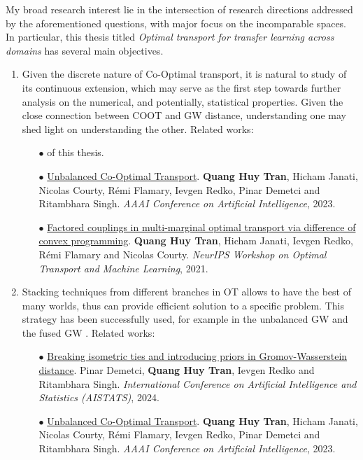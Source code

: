 My broad research interest lie in the intersection of research directions addressed
by the aforementioned questions, with major focus on the incomparable spaces.
In particular, this thesis titled
\textit{Optimal transport for transfer learning across domains} has several main objectives.
\begin{enumerate}
    \item Given the discrete nature of Co-Optimal transport, it is natural to study of its continuous extension,
    which may serve as the first step towards further analysis on the numerical,
    and potentially, statistical properties. Given the close connection between
    COOT and GW distance,
    understanding one may shed light on understanding the other. Related works:
    \begin{itemize}
        \item[$\bullet$]  of this thesis.

        \item[$\bullet$] \ul{Unbalanced Co-Optimal Transport}. \textbf{Quang Huy Tran},
        Hicham Janati, Nicolas Courty, Rémi Flamary, Ievgen Redko, Pinar Demetci and Ritambhara Singh.
        \textit{AAAI Conference on Artificial Intelligence}, 2023.

        \item[$\bullet$] \ul{Factored couplings in multi-marginal optimal transport via difference of
        convex programming}. \textbf{Quang Huy Tran}, Hicham Janati, Ievgen Redko,
        Rémi Flamary and Nicolas Courty.
        \textit{NeurIPS Workshop on Optimal Transport and Machine Learning}, 2021.
    \end{itemize}

    \item Stacking techniques from different branches in OT allows to have the best of many worlds,
    thus can provide efficient solution to a specific problem. This strategy has been successfully used,
    for example in the unbalanced GW \citep{Sejourne20} and the fused GW \citep{Vayer19b}. Related works:
    \begin{itemize}
        \item[$\bullet$] \ul{Breaking isometric ties and introducing priors in Gromov-Wasserstein distance}.
        Pinar Demetci, \textbf{Quang Huy Tran}, Ievgen Redko and Ritambhara Singh.
        \textit{International Conference on Artificial Intelligence and Statistics (AISTATS)}, 2024.

        \item[$\bullet$] \ul{Unbalanced Co-Optimal Transport}. \textbf{Quang Huy Tran}, Hicham Janati,
        Nicolas Courty, Rémi Flamary, Ievgen Redko, Pinar Demetci and Ritambhara Singh.
        \textit{AAAI Conference on Artificial Intelligence}, 2023.


\end{itemize}
\end{enumerate}
